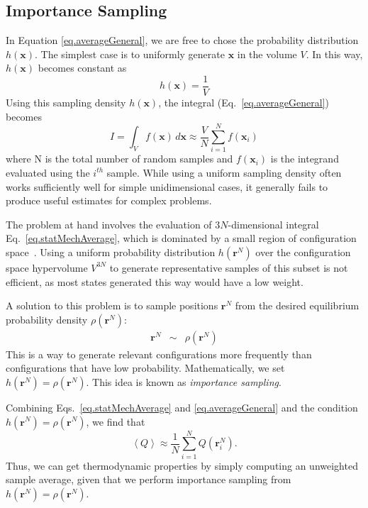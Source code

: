 \documentclass[aip,jcp,preprint,superscriptaddress,floatfix]{revtex4-1}
\begin{document}
\subsection{Importance Sampling}

In Equation \ref{eq.averageGeneral}, we are free to chose the probability
distribution
$h(\textbf{x})$. The simplest case is to uniformly generate $\textbf{x}$
in the volume $V$. In this way, $h(\textbf{x})$ becomes constant as
\begin{equation}
	h(\textbf{x}) = \frac{1}{V}
	\label{eq.uniformDist}
\end{equation}
Using this sampling density $h(\textbf{x})$, the integral (Eq.~\ref{eq.averageGeneral}) becomes
\begin{equation}
	I = \int_V f(\textbf{x}) \, d\textbf{x} \approx \frac{V}{N} \sum_{i=1}^N
	f(\textbf{x}_i)
	\label{eq.averageUniform}
\end{equation}
where N is the total number of random samples and $f(\textbf{x}_i)$ is the
integrand evaluated using the $i^{th}$ sample. While using a
uniform sampling density often works sufficiently well for simple unidimensional cases, it generally fails to produce useful estimates
for complex problems.

The problem at hand involves the evaluation of $3N$-dimensional integral Eq.~\ref{eq.statMechAverage}, which is dominated by a small region of configuration space~\cite{Tuckerman.Book,Hill.Book,McQuarrie.Book}. 
Using a uniform probability distribution $h(\textbf{r}^N)$ over the configuration space hypervolume $V^{3N}$ to generate
representative samples of this subset is not efficient,
as most states generated this way would have a low weight.

A solution to this problem is to sample positions $\textbf{r}^N$ from the desired equilibrium probability density $\rho\left(\textbf{r}^N\right)$:
\begin{eqnarray}
	\textbf{r}^N &\sim& \rho(\textbf{r}^N)
\end{eqnarray}
This is a way to generate
relevant configurations more frequently than configurations that have low
probability.
Mathematically, we set $h(\textbf{r}^N)=\rho\left(\textbf{r}^N\right)$.
This idea is known as \textit{importance sampling}.

Combining Eqs.~\ref{eq.statMechAverage} and \ref{eq.averageGeneral}
and the condition $h(\textbf{r}^N)=\rho\left(\textbf{r}^N\right)$,
we find that
\begin{equation}
	\left<Q\right> \approx \frac{1}{N} \sum_{i=1}^N Q\left(\textbf{r}_i^N\right) .
	\label{eq.importanceSamplingAverage}
\end{equation}
Thus, we can get thermodynamic properties by simply computing an unweighted sample average, given
that we perform importance sampling from $h(\textbf{r}^N)=\rho\left(\textbf{r}^N\right)$.
\end{document}
